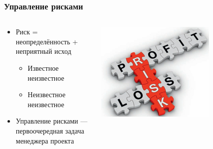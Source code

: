 \documentclass{../../slides-style}
\begin{document}
    \begin{frame}
        \frametitle{Управление рисками}
        \begin{columns}
            \begin{column}{0.6\textwidth}
                \begin{itemize}
                    \item Риск = неопределённость + неприятный исход
                    \begin{itemize}
                        \item Известное неизвестное
                        \item Неизвестное неизвестное
                    \end{itemize}
                    \item Управление рисками --- первоочередная задача менеджера проекта
                \end{itemize}
            \end{column}
            \begin{column}{0.4\textwidth}
                \begin{center}
                    \includegraphics[width=0.7\textwidth]{riskManagement.png}
                \end{center}
            \end{column}
        \end{columns}
    \end{frame}
\end{document}
